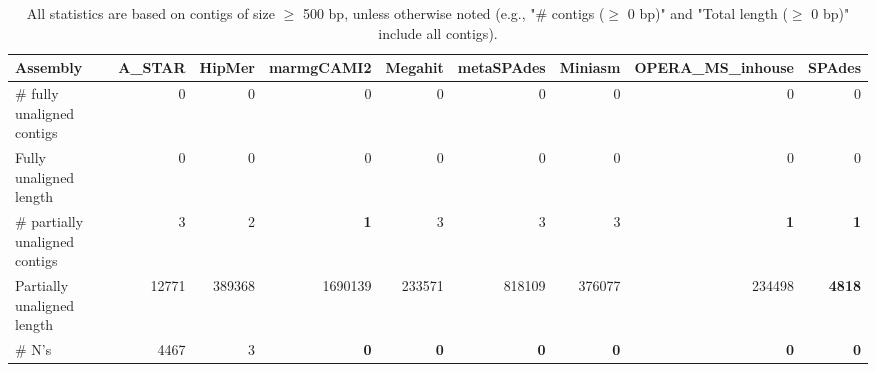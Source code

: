 \documentclass[12pt,a4paper]{article}
\begin{document}
\begin{table}[ht]
\begin{center}
\caption{All statistics are based on contigs of size $\geq$ 500 bp, unless otherwise noted (e.g., "\# contigs ($\geq$ 0 bp)" and "Total length ($\geq$ 0 bp)" include all contigs).}
\begin{tabular}{|l*{8}{|r}|}
\hline
Assembly & A\_STAR & HipMer & marmgCAMI2 & Megahit & metaSPAdes & Miniasm & OPERA\_MS\_inhouse & SPAdes \\ \hline
\# fully unaligned contigs & 0 & 0 & 0 & 0 & 0 & 0 & 0 & 0 \\ \hline
Fully unaligned length & 0 & 0 & 0 & 0 & 0 & 0 & 0 & 0 \\ \hline
\# partially unaligned contigs & 3 & 2 & {\bf 1} & 3 & 3 & 3 & {\bf 1} & {\bf 1} \\ \hline
Partially unaligned length & 12771 & 389368 & 1690139 & 233571 & 818109 & 376077 & 234498 & {\bf 4818} \\ \hline
\# N's & 4467 & 3 & {\bf 0} & {\bf 0} & {\bf 0} & {\bf 0} & {\bf 0} & {\bf 0} \\ \hline
\end{tabular}
\end{center}
\end{table}
\end{document}

